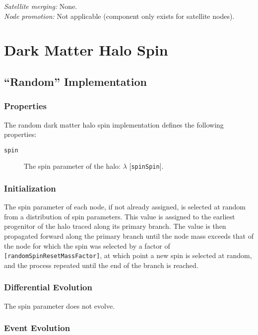 \noindent\emph{Satellite merging:} None.\\

\noindent\emph{Node promotion:} Not applicable (component only exists for satellite nodes).\\


\section{Dark Matter Halo Spin}\label{sec:DarkMatterHaloSpinComponent}

\subsection{``Random'' Implementation}

\subsubsection{Properties}

The random dark matter halo spin implementation defines the following properties:
\begin{description}
 \item [{\tt spin}] The spin parameter of the halo: $\lambda$ [{\tt spinSpin}].
\end{description}

\subsubsection{Initialization}

The spin parameter of each node, if not already assigned, is selected at random from a distribution of spin parameters. This value is assigned to the earliest progenitor of the halo traced along its primary branch. The value is then propagated forward along the primary branch until the \gls{node} mass exceeds that of the \gls{node} for which the spin was selected by a factor of {\tt [randomSpinResetMassFactor]}, at which point a new spin is selected at random, and the process repeated until the end of the branch is reached. 

\subsubsection{Differential Evolution}

The spin parameter does not evolve.

\subsubsection{Event Evolution}

